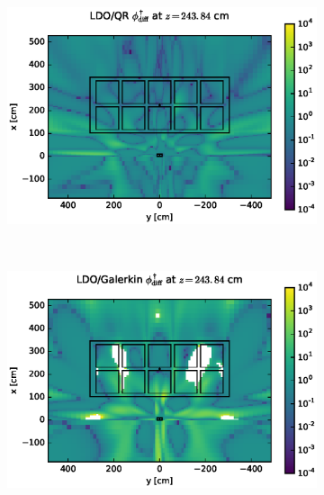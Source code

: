 \clearpage
\begin{figure}[!htb]
\begin{subfigure}{\textwidth}
\centering
\includegraphics[max height=0.445\textheight]
{img/cargo-plots/cad-adj/flux-diff-rel-qr04.eps}
\end{subfigure}
\\
\begin{subfigure}{\textwidth}
\centering
\includegraphics[max height=0.445\textheight]
{img/cargo-plots/cad-adj/flux-diff-rel-gkn04.eps}
\end{subfigure}
\end{figure}
\clearpage
